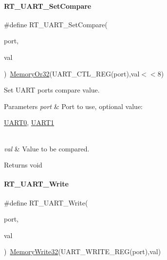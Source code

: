 \paragraph{\texorpdfstring{R\+T\+\_\+\+U\+A\+R\+T\+\_\+\+Set\+Compare}{RT\_UART\_SetCompare}}
{\footnotesize\ttfamily \#define R\+T\+\_\+\+U\+A\+R\+T\+\_\+\+Set\+Compare(\begin{DoxyParamCaption}\item[{}]{port,  }\item[{}]{val }\end{DoxyParamCaption})~\mbox{\hyperlink{a00026_a27874a97deab7cecdde5ddecf466e31e}{Memory\+Or32}}(U\+A\+R\+T\+\_\+\+C\+T\+L\+\_\+\+R\+EG(port),val$<$$<$8)}



Set U\+A\+RT port\textquotesingle{}s compare value. 


\begin{DoxyParams}{Parameters}
{\em port} & Port to use, optional value\+:
\begin{DoxyCode}
\mbox{\hyperlink{a00098_a0508661f121639ffdee7de2353a0def2}{UART0}}, \mbox{\hyperlink{a00098_a8d69bf04d07af4fbbab5a8bd291f65ff}{UART1}}
\end{DoxyCode}
 \\
\hline
{\em val} & Value to be compared. \\
\hline
\end{DoxyParams}
\begin{DoxyReturn}{Returns}
void 
\end{DoxyReturn}
\mbox{\label{a00098_a3c30d4d2e260d1c2f96747e9d7bdaf0d}} 
\paragraph{\texorpdfstring{R\+T\+\_\+\+U\+A\+R\+T\+\_\+\+Write}{RT\_UART\_Write}}
{\footnotesize\ttfamily \#define R\+T\+\_\+\+U\+A\+R\+T\+\_\+\+Write(\begin{DoxyParamCaption}\item[{}]{port,  }\item[{}]{val }\end{DoxyParamCaption})~\mbox{\hyperlink{a00026_a6b9732365b12e48ddb89fe1028b975b0}{Memory\+Write32}}(U\+A\+R\+T\+\_\+\+W\+R\+I\+T\+E\+\_\+\+R\+EG(port),val)}



